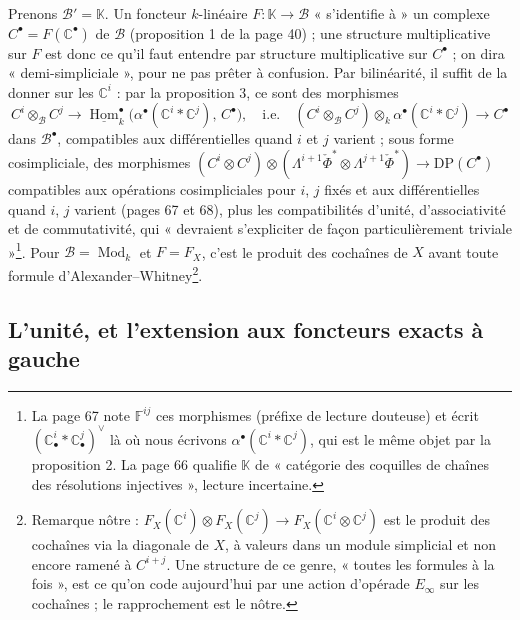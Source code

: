 \documentclass[11pt,a4paper]{article}
\begin{document}
Prenons $\mathcal{B}' = \mathbb{K}$. Un foncteur $k$-linéaire $F :
\mathbb{K} \to \mathcal{B}$ « s'identifie à » un complexe $C^{\bullet} =
F(\mathbb{C}^{\bullet})$ de $\mathcal{B}$ (proposition 1 de la page 40) ;
une structure multiplicative sur $F$ est donc ce qu'il faut entendre par
structure multiplicative sur $C^{\bullet}$ ; on dira « demi-simpliciale »,
pour ne pas prêter à confusion. Par bilinéarité, il suffit de la donner sur
les $\mathbb{C}^{i}$ : par la proposition 3, ce sont des morphismes
\[
  C^{i} \otimes_{\mathcal{B}} C^{j} \longrightarrow
  \underline{\operatorname{Hom}}^{\bullet}_{k}\bigl(\alpha^{\bullet}(\mathbb{C}^{i}
  * \mathbb{C}^{j}),\, C^{\bullet}\bigr), \quad \text{i.e.} \quad
  (C^{i} \otimes_{\mathcal{B}} C^{j}) \otimes_{k} \alpha^{\bullet}(\mathbb{C}^{i}
  * \mathbb{C}^{j}) \longrightarrow C^{\bullet}
\]
dans $\mathcal{B}^{\bullet}$, compatibles aux différentielles quand $i$ et
$j$ varient ; sous forme cosimpliciale, des morphismes
$(C^{i} \otimes C^{j}) \otimes (\Lambda^{i+1}\check{\Phi}^{*} \otimes
\Lambda^{j+1}\check{\Phi}^{*}) \to \mathrm{DP}(C^{\bullet})$ compatibles aux
opérations cosimpliciales pour $i$, $j$ fixés et aux différentielles quand
$i$, $j$ varient (pages 67 et 68), plus les compatibilités d'unité,
d'associativité et de commutativité, qui « devraient s'expliciter de façon
particulièrement triviale »\footnote{La page 67 note $\mathbb{F}^{ij}$ ces
morphismes (préfixe de lecture douteuse) et écrit
$(\mathbb{C}^{i}_{\bullet} * \mathbb{C}^{j}_{\bullet})^{\vee}$ là où nous
écrivons $\alpha^{\bullet}(\mathbb{C}^{i} * \mathbb{C}^{j})$, qui est le
même objet par la proposition 2. La page 66 qualifie $\mathbb{K}$ de
« catégorie des coquilles de chaînes des résolutions injectives »,
lecture incertaine.}. Pour $\mathcal{B} = \operatorname{Mod}_{k}$ et
$F = F_{X}$, c'est le produit des cochaînes de $X$ avant toute formule
d'Alexander–Whitney\footnote{Remarque nôtre : $F_{X}(\mathbb{C}^{i}) \otimes
F_{X}(\mathbb{C}^{j}) \to F_{X}(\mathbb{C}^{i} \otimes \mathbb{C}^{j})$ est le
produit des cochaînes via la diagonale de $X$, à valeurs dans un module
simplicial et non encore ramené à $C^{i+j}$. Une structure de ce genre,
« toutes les formules à la fois », est ce qu'on code aujourd'hui par une
action d'opérade $E_{\infty}$ sur les cochaînes ; le rapprochement est le
nôtre.}.

\subsection*{L'unité, et l'extension aux foncteurs exacts à gauche}
\end{document}
